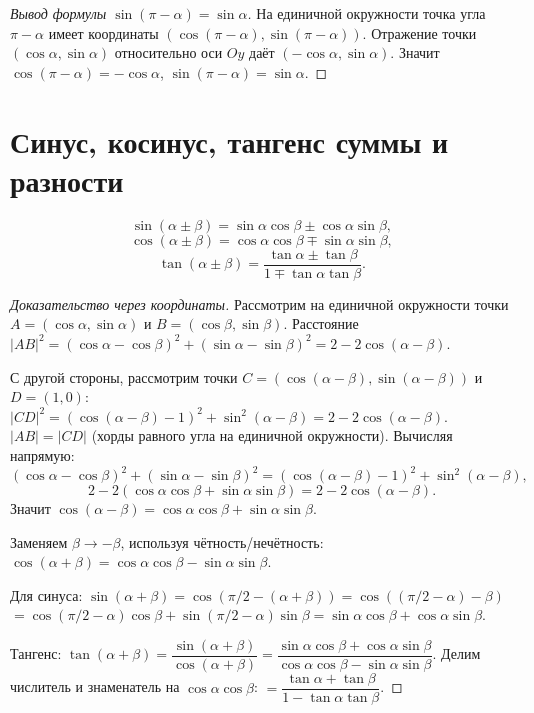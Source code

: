 \documentclass[12pt]{article}
\begin{document}
\begin{proof}[Вывод формулы $\sin(\pi - \alpha) = \sin\alpha$]
На единичной окружности точка угла $\pi - \alpha$ имеет координаты
$(\cos(\pi-\alpha), \sin(\pi-\alpha))$. Отражение точки $(\cos\alpha, \sin\alpha)$
относительно оси $Oy$ даёт $(-\cos\alpha, \sin\alpha)$.
Значит $\cos(\pi-\alpha) = -\cos\alpha$, $\sin(\pi-\alpha) = \sin\alpha$.
\end{proof}

\section{Синус, косинус, тангенс суммы и разности}

\begin{theorem}
\[
\sin(\alpha \pm \beta) = \sin\alpha\cos\beta \pm \cos\alpha\sin\beta,
\]
\[
\cos(\alpha \pm \beta) = \cos\alpha\cos\beta \mp \sin\alpha\sin\beta,
\]
\[
\tan(\alpha \pm \beta) = \frac{\tan\alpha \pm \tan\beta}
{1 \mp \tan\alpha\tan\beta}.
\]
\end{theorem}

\begin{proof}[Доказательство через координаты]
Рассмотрим на единичной окружности точки
$A = (\cos\alpha, \sin\alpha)$ и $B = (\cos\beta, \sin\beta)$.
Расстояние $|AB|^2 = (\cos\alpha - \cos\beta)^2 + (\sin\alpha - \sin\beta)^2
= 2 - 2\cos(\alpha - \beta)$.

С другой стороны, рассмотрим точки $C = (\cos(\alpha-\beta), \sin(\alpha-\beta))$
и $D = (1, 0)$:
$|CD|^2 = (\cos(\alpha-\beta)-1)^2 + \sin^2(\alpha-\beta)
= 2 - 2\cos(\alpha-\beta)$.
$|AB| = |CD|$ (хорды равного угла на единичной окружности).
Вычисляя напрямую:
\[
(\cos\alpha - \cos\beta)^2 + (\sin\alpha - \sin\beta)^2
= (\cos(\alpha-\beta)-1)^2 + \sin^2(\alpha-\beta),
\]
\[
2 - 2(\cos\alpha\cos\beta + \sin\alpha\sin\beta)
= 2 - 2\cos(\alpha-\beta).
\]
Значит $\cos(\alpha-\beta) = \cos\alpha\cos\beta + \sin\alpha\sin\beta$.

Заменяем $\beta \to -\beta$, используя чётность/нечётность:
$\cos(\alpha+\beta) = \cos\alpha\cos\beta - \sin\alpha\sin\beta$.

Для синуса: $\sin(\alpha+\beta) = \cos(\pi/2 - (\alpha+\beta))
= \cos((\pi/2 - \alpha) - \beta)$
$= \cos(\pi/2-\alpha)\cos\beta + \sin(\pi/2-\alpha)\sin\beta
= \sin\alpha\cos\beta + \cos\alpha\sin\beta$.

Тангенс: $\tan(\alpha+\beta) = \dfrac{\sin(\alpha+\beta)}{\cos(\alpha+\beta)}
= \dfrac{\sin\alpha\cos\beta + \cos\alpha\sin\beta}{\cos\alpha\cos\beta - \sin\alpha\sin\beta}$.
Делим числитель и знаменатель на $\cos\alpha\cos\beta$:
$= \dfrac{\tan\alpha + \tan\beta}{1 - \tan\alpha\tan\beta}$.
\end{proof}
\end{document}
